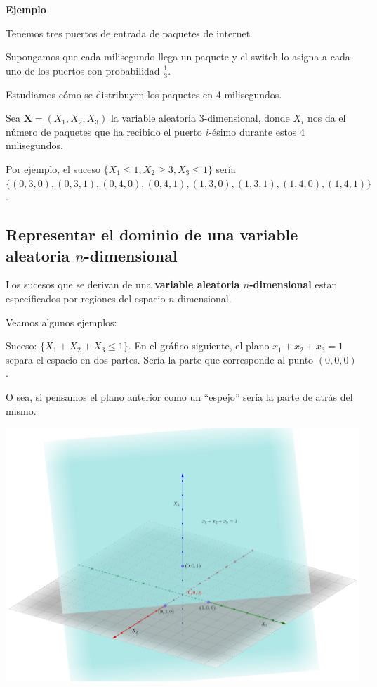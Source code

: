 \documentclass[]{book}
\begin{document}
\textbf{Ejemplo}

Tenemos tres puertos de entrada de paquetes de internet.

Supongamos que cada milisegundo llega un paquete y el switch lo asigna a cada uno de los puertos con probabilidad \(\frac{1}{3}\).

Estudiamos cómo se distribuyen los paquetes en 4 milisegundos.

Sea \(\mathbf{X}=(X_1,X_2,X_3)\) la variable aleatoria 3-dimensional, donde \(X_i\) nos da el número de paquetes que ha recibido el puerto \(i\)-ésimo durante estos 4 milisegundos.

Por ejemplo, el suceso \(\{X_1\leq 1, X_2\geq 3, X_3\leq 1\}\) sería \(\{(0,3,0),(0,3,1),(0,4,0),(0,4,1),(1,3,0),(1,3,1),(1,4,0),(1,4,1)\}\).

\hypertarget{representar-el-dominio-de-una-variable-aleatoria-n-dimensional}{%
\subsection{\texorpdfstring{Representar el dominio de una variable aleatoria \(n\)-dimensional}{Representar el dominio de una variable aleatoria n-dimensional}}\label{representar-el-dominio-de-una-variable-aleatoria-n-dimensional}}

Los sucesos que se derivan de una \textbf{variable aleatoria \(n\)-dimensional} estan especificados por regiones del espacio \(n\)-dimensional.

Veamos algunos ejemplos:

Suceso: \(\{X_1+X_2+X_3\leq 1\}\). En el gráfico siguiente, el plano \(x_1+x_2+x_3=1\) separa el espacio en dos partes. Sería la parte que corresponde al punto \((0,0,0)\).

O sea, si pensamos el plano anterior como un ``espejo'' sería la parte de atrás del mismo.

\includegraphics{Images/EjPlano3D.png}
\end{document}
